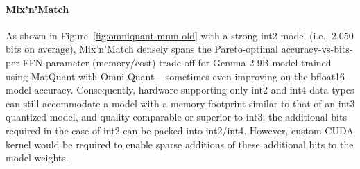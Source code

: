\paragraph{Mix'n'Match} As shown in Figure~\ref{fig:omniquant-mnm-old} with a strong int2 model (i.e., 2.050 bits on average), \epalg Mix’n’Match densely spans the Pareto-optimal accuracy-vs-bits-per-FFN-parameter (memory/cost) trade-off for Gemma-2 9B model trained using MatQuant with Omni-Quant – sometimes even improving on the bfloat16 model accuracy. Consequently, hardware supporting only int2 and int4 data types can still accommodate a model with a memory footprint similar to that of an int3 quantized model, and quality comparable or superior to int3; the additional bits required in the case of int2 can be packed into int2/int4. However, custom CUDA kernel would be required to enable sparse additions of these additional bits to the model weights. 

